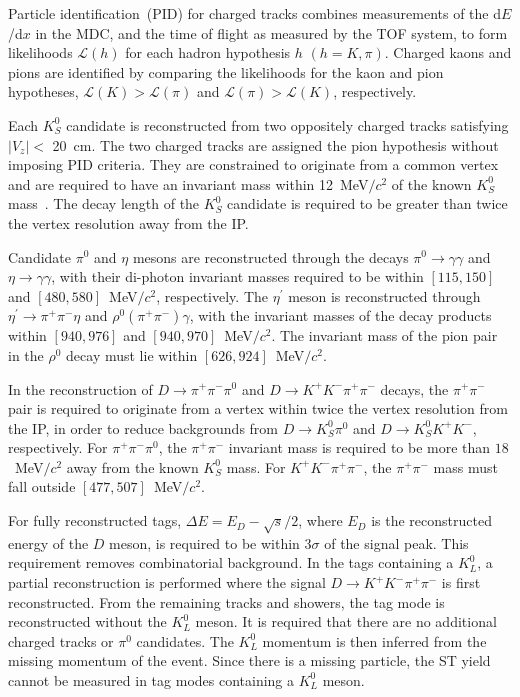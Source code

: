 \documentclass[12pt, a4paper, notitlepage, onecolumn]{article}
\begin{document}
Particle identification~(PID) for charged tracks combines measurements of the d$E$/d$x$ in the MDC, and the time of flight as measured by the TOF system, to form likelihoods $\mathcal{L}(h)$ for each hadron hypothesis $h$ $(h=K,\pi)$. Charged kaons and pions are identified by comparing the likelihoods for the kaon and pion hypotheses, $\mathcal{L}(K)>\mathcal{L}(\pi)$ and $\mathcal{L}(\pi)>\mathcal{L}(K)$, respectively.

Each $K_{S}^0$ candidate is reconstructed from two oppositely charged tracks satisfying $|V_{z}|<$ 20~cm. The two charged tracks are assigned the pion hypothesis without imposing PID criteria. They are constrained to originate from a common vertex and are required to have an invariant mass within 12~MeV$/c^{2}$ of the known $K^0_{S}$ mass~\cite{pdg}. The decay length of the $K^0_S$ candidate is required to be greater than twice the vertex resolution away from the IP.

Candidate $\pi^0$ and $\eta$ mesons are reconstructed through the decays $\pi^0\to\gamma\gamma$ and $\eta\to\gamma\gamma$, with their di-photon invariant masses required to be within $[115, 150]$ and $[480, 580]$~MeV$/c^2$, respectively. The $\eta^\prime$ meson is reconstructed through  $\eta^\prime\to\pi^+\pi^-\eta$ and $\rho^0(\pi^+\pi^-)\gamma$, with the invariant masses of the decay products within $[940, 976]$ and $[940, 970]$~MeV$/c^2$. The invariant mass of the pion pair in the $\rho^0$ decay must lie within $[626, 924]$~MeV$/c^2$.

In the reconstruction of $D\to\pi^+\pi^-\pi^0$ and $D\to K^+K^-\pi^+\pi^-$ decays, the $\pi^+\pi^-$ pair is required to originate from a vertex within twice the vertex resolution from the IP, in order to reduce backgrounds from $D\to K_S^0\pi^0$ and $D\to K_S^0K^+K^-$, respectively. For $\pi^+\pi^-\pi^0$, the $\pi^+\pi^-$ invariant mass is required to be more than $18$~MeV$/c^2$ away from the known $K_S^0$ mass. For $K^+K^-\pi^+\pi^-$, the $\pi^+\pi^-$ mass must fall outside $[477, 507]$~MeV$/c^2$.

For fully reconstructed tags, $\Delta E = E_D - \sqrt{s}/2$, where $E_D$ is the reconstructed energy of the $D$ meson, is required to be within $3\sigma$ of the signal peak. This requirement removes combinatorial background. In the tags containing a $K_L^0$, a partial reconstruction is performed where the signal $D\to K^+K^-\pi^+\pi^-$ is first reconstructed. From the remaining tracks and showers, the tag mode is reconstructed without the $K_L^0$ meson. It is required that there are no additional charged tracks or $\pi^0$ candidates. The $K_L^0$ momentum is then inferred from the missing momentum of the event. Since there is a missing particle, the ST yield cannot be measured in tag modes containing a $K_L^0$ meson.
\end{document}
